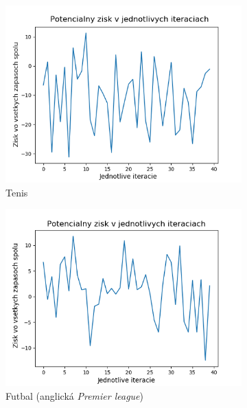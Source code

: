 \begin{figure}[h!]
  \begin{subfigure}[b]{0.48\textwidth}
    \includegraphics[width=\textwidth]{../img/ffnn_tenis_prof.png} 
    \caption{Tenis} 
  \end{subfigure} 
  \begin{subfigure}[b]{0.48\textwidth}
    \includegraphics[width=\textwidth]{../img/ffnn_eng_prof.png} 
    \caption{Futbal (anglická \textit{Premier league})} 
  \end{subfigure} 
  \begin{subfigure}[b]{0.48\textwidth}

\end{subfigure}
\end{figure}
